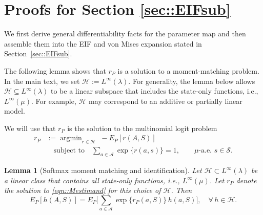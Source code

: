 \documentclass[11pt]{article}
\DeclareMathOperator*{\argmin}{argmin}
\theoremstyle{plain}
\newtheorem{lemma}[theorem]{Lemma}
\begin{document}
\section{Proofs for Section \ref{sec::EIFsub}}

 \label{appendix::EIFsub}

We first derive general differentiability facts for the parameter map and then
assemble them into the EIF and von Mises expansion stated in
Section~\ref{sec::EIFsub}.



The following lemma shows that $r_P$ is a solution to a moment-matching problem. In the main text, we set $\mathcal{H} := L^\infty(\lambda)$. For generality, the lemma below allows \(\mathcal{H} \subseteq L^\infty(\lambda)\) to be a linear subspace that includes the state-only functions, i.e., $L^\infty(\mu)$. For example, $\mathcal{H}$ may correspond to an additive or partially linear model.



 
We will use that $r_P$ is the solution to the multinomial logit 
problem
\begin{equation}\label{eqn::Mestimand}
\begin{aligned}
r_P 
&:= \argmin_{r \in \mathcal{H}} \; -E_P[r(A,S)] \\
&\quad \text{subject to} \quad 
\sum_{a \in \mathcal{A}} \exp\{r(a,s)\} = 1,
\qquad \mu\text{-a.e.\ } s \in \mathcal{S}.
\end{aligned}
\end{equation}






\begin{lemma}[Softmax moment matching and identification]\label{thm:softmax-moment-matching}
Let $\mathcal H \subset L^\infty(\lambda)$ be a linear class that contains all state-only functions, i.e., $L^\infty(\mu)$. Let $r_P$ denote the solution to \eqref{eqn::Mestimand} for this choice of $\mathcal{H}$. Then
\[
E_P[h(A,S)]
= E_{P}\!\Big[\sum_{a\in\mathcal A} \exp\{ r_P(a,S) \}\,h(a,S)\Big],
\quad \forall\, h\in\mathcal H .
\]
\end{lemma}
\end{document}
